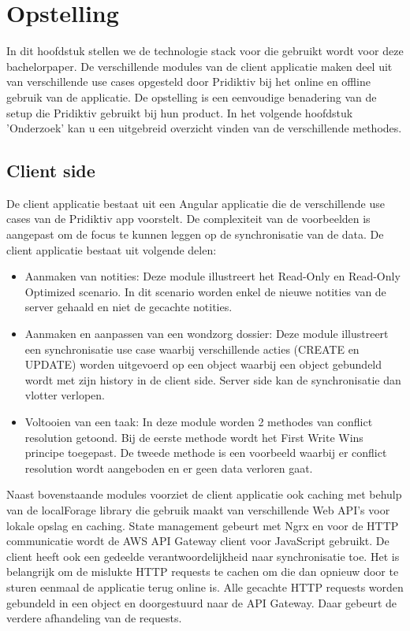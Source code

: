 
\chapter{Opstelling}
\label{ch:setup}


In dit hoofdstuk stellen we de technologie stack voor die gebruikt wordt voor deze bachelorpaper. De verschillende modules van de client applicatie maken deel uit van verschillende use cases opgesteld door Pridiktiv bij het online en offline gebruik van de applicatie. De opstelling is een eenvoudige benadering van de setup die Pridiktiv gebruikt bij hun product. In het volgende hoofdstuk 'Onderzoek' kan u een uitgebreid overzicht vinden van de verschillende methodes. 

\section{Client side}
De client applicatie bestaat uit een Angular applicatie die de verschillende use cases van de Pridiktiv app voorstelt. De complexiteit van de voorbeelden is aangepast om de focus te kunnen leggen op de synchronisatie van de data. De client applicatie bestaat uit volgende delen:
\begin{itemize}
\item Aanmaken van notities: Deze module illustreert het Read-Only en Read-Only Optimized scenario. In dit scenario worden enkel de nieuwe notities van de server gehaald en niet de gecachte notities.
\item Aanmaken en aanpassen van een wondzorg dossier: Deze module illustreert een synchronisatie use case waarbij verschillende acties (CREATE en UPDATE) worden uitgevoerd op een object waarbij een object gebundeld wordt met zijn history in de client side. Server side kan de synchronisatie dan vlotter verlopen.
\item Voltooien van een taak: In deze module worden 2 methodes van conflict resolution getoond. Bij de eerste methode wordt het First Write Wins principe toegepast. De tweede methode is een voorbeeld waarbij er conflict resolution wordt aangeboden en er geen data verloren gaat.
\end{itemize}
Naast bovenstaande modules voorziet de client applicatie ook caching met behulp van de localForage library die gebruik maakt van verschillende Web API's voor lokale opslag en caching. State management gebeurt met Ngrx en voor de HTTP communicatie wordt de AWS API Gateway client voor JavaScript gebruikt. De client heeft ook een gedeelde verantwoordelijkheid naar synchronisatie toe. Het is belangrijk om de mislukte HTTP requests te cachen om die dan opnieuw door te sturen eenmaal de applicatie terug online is. Alle gecachte HTTP requests worden gebundeld in een object en doorgestuurd naar de API Gateway. Daar gebeurt de verdere afhandeling van de requests.
